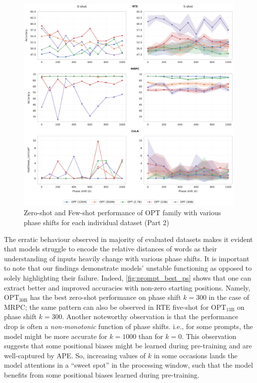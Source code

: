 \documentclass[letterpaper, 12pt]{report}
\begin{document}
\begin{figure}
    \centering
    \includegraphics[width=\textwidth]{figs/pos/v2_prompt_phase_shift_all_ds_part1.pdf}
    \caption{Zero-shot and Few-shot performance of OPT family with various phase shifts for each individual dataset (Part 2)}
    \label{fig:propmt_all_ds_part1}
\end{figure}



The erratic behaviour observed in majority of evaluated datasets makes it evident that models struggle to encode the relative distances of words as their understanding of inputs heavily change with various phase shifts.
It is important to note that our findings demonstrate models' unstable functioning as opposed to solely highlighting their failure. Indeed, \autoref{fig:prompt_best_ps} shows that one can extract better and improved accuracies with non-zero starting positions.
Namely, $\text{OPT}_{\text{30B}}$ has the best zero-shot performance on phase shift $k=300$ in the case of MRPC; the same pattern can also be observed in RTE five-shot for $\text{OPT}_{\text{13B}}$ on phase shift $k=300$.
Another noteworthy observation is that the performance drop is often a \emph{non-monotonic} function of phase shifts. i.e., for some prompts, the model might be more accurate for $k=1000$ than for $k=0$.
This observation suggests that some positional biases might be learned during pre-training and are well-captured by APE. So, increasing values of $k$ in some occasions lands the model attentions in a ``sweet spot'' in the processing window, such that the model benefits from some positional biases learned during pre-training.
\end{document}
